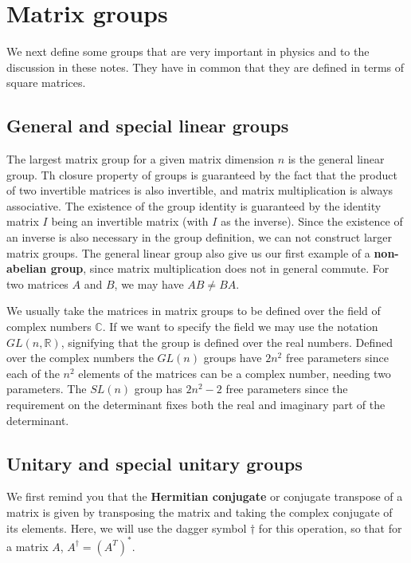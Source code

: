 \documentclass[notes.tex]{subfiles}
\begin{document}
\section{Matrix groups}
\label{sec:matrix_groups}
We next define some groups that are very important in physics and to the discussion in these notes. They have in common that they are defined in terms of square matrices.

\subsection{General and special linear groups}
The largest matrix group for a given matrix dimension $n$ is the general linear group.
Th closure property of groups is guaranteed by the fact that the product of two invertible matrices is also invertible, and matrix multiplication is always associative.
The existence of the group identity is guaranteed by the identity matrix $I$ being an invertible matrix (with $I$ as the inverse). Since the existence of an inverse is also necessary in the group definition, we can not construct larger matrix groups. The general linear group also give us our first example of a {\bf non-abelian group}, since matrix multiplication does not in general commute. For two matrices $A$ and $B$, we may have $AB\ne BA$.

We usually take the matrices in matrix groups to be defined over the field of complex numbers $\mathbb{C}$. If we want to specify the field we may use the notation $GL(n, \mathbb{R})$, signifying that the group is defined over the real numbers. Defined over the complex numbers the $GL(n)$ groups have $2n^2$ free parameters since each of the $n^2$ elements of the matrices can be a complex number, needing two parameters. The $SL(n)$ group has $2n^2-2$ free parameters since the requirement on the determinant fixes both the real and imaginary part of the determinant.

\subsection{Unitary and special unitary groups}
\label{sec:unitary_groups}
We first remind you that the {\bf Hermitian conjugate} or conjugate transpose of a matrix is given by transposing the matrix and taking the complex conjugate of its elements. Here, we will use the dagger symbol $\dagger$ for this operation, so that for a matrix $A$, $A^\dagger=(A^T)^*$.
\end{document}
